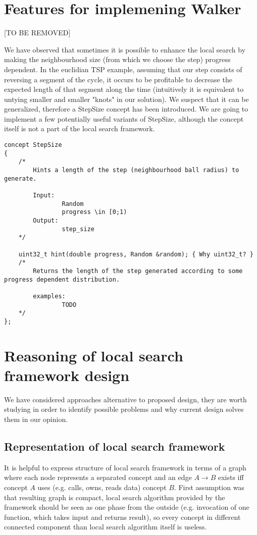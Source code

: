 \section{Features for implemening Walker}
[TO BE REMOVED]

We have observed that sometimes it is possible to enhance the local search
by making the neighbourhood size (from which we choose the step) progress dependent.
In the euclidian TSP example, assuming that our step consists of reversing a segment of the cycle,
it occurs to be profitable to decrease the expected length of that segment along the time
(intuitively it is equivalent to untying smaller and smaller "knots" in our solution).
We suspect that it can be generalized, therefore a StepSize concept has been introduced.
We are going to implement a few potentially useful variants of StepSize,
although the concept itself is not a part of the local search framework.

\begin{lstlisting}
concept StepSize
{
	/*
		Hints a length of the step (neighbourhood ball radius) to generate.

		Input:
				Random
				progress \in [0;1)
		Output:
				step_size
	*/

	uint32_t hint(double progress, Random &random); { Why uint32_t? }
	/*
		Returns the length of the step generated according to some progress dependent distribution.

		examples:
				TODO
	*/
};
\end{lstlisting}

\section{Reasoning of local search framework design}

We have considered approaches alternative to proposed design, they are worth
studying in order to identify possible problems and why current design solves
them in our opinion.

\subsection{Representation of local search framework}
It is helpful to express structure of local search framework in terms of a
graph where each node represents a separated concept and an edge $A \to B$
exists iff concept $A$ uses (e.g. calls, owns, reads data) concept $B$. First
assumption was that resulting graph is compact, local search algorithm provided
by the framework should be seen as one phase from the outside (e.g. invocation
of one function, which takes input and returns result), so every concept in
different connected component than local search algorithm itself is useless.

